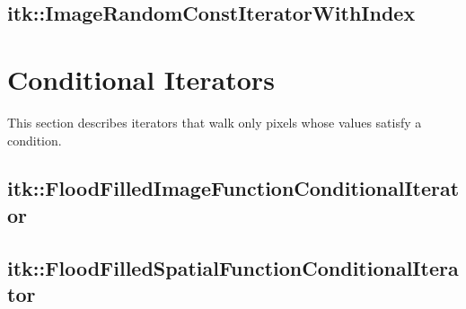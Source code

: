 \subsection{itk::ImageRandomConstIteratorWithIndex}
\label{sec:itkImageRandomConstIteratorWithIndex}


\section{Conditional Iterators}
\label{sec:ConditionalIterators}
This section describes iterators that walk only pixels whose values satisfy a
condition.



%

\subsection{itk::FloodFilledImageFunctionConditionalIterator}
\label{itk::FloodFilledImageFunctionConditionalIterator}


\subsection{itk::FloodFilledSpatialFunctionConditionalIterator}
\label{itk::FloodFilledSpatialFunctionConditionalIterator}


